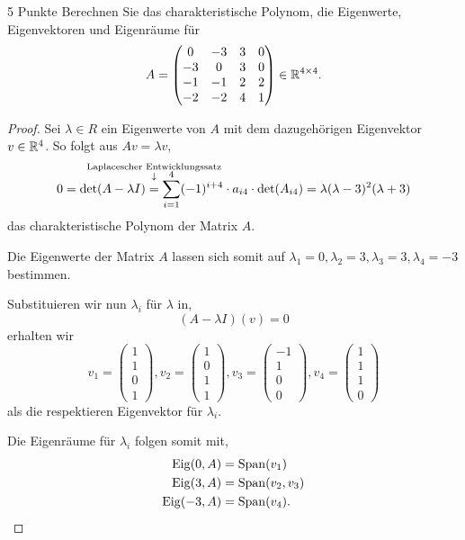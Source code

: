 \documentclass{problemset}
\begin{document}
\begin{problem}{5 Punkte}
Berechnen Sie das charakteristische Polynom, die Eigenwerte, Eigenvektoren und
Eigenräume für \[
    A = \begin{pmatrix}
        0 & -3 & 3 & 0 \\ -3 & 0 & 3 & 0 \\ -1 & -1 & 2 & 2 \\ -2 & -2 & 4 & 1
    \end{pmatrix} \in \mathbb{R}^{4 \times 4}.
\]
\begin{proof}
    Sei \(\lambda \in R\) ein Eigenwerte von \(A\) mit dem dazugehörigen
    Eigenvektor \(v \in \mathbb{R}^4\). So folgt aus \(Av = \lambda v\), \[
        0 = \det(A - \lambda I)
        \annotated{Laplacescher Entwicklungssatz}{=} \sum_{i=1}^{4} (-1)^{i+4} \cdot a_{i4} \cdot \det(A_{i4})
        = \lambda (\lambda - 3)^2(\lambda + 3)
    \] das charakteristische Polynom der Matrix \(A\).

    Die Eigenwerte der Matrix \(A\) lassen sich somit auf \(\lambda_1 = 0,
    \lambda_2 = 3, \lambda_3 = 3, \lambda_4 = -3\) bestimmen.

    Substituieren wir nun \(\lambda_i\) für \(\lambda\) in, \[
        (A - \lambda I)(v) = 0
    \] erhalten wir \[
        v_1 = \begin{pmatrix}
            1 \\ 1 \\ 0 \\ 1
        \end{pmatrix},
        v_2 = \begin{pmatrix}
            1 \\ 0 \\ 1 \\ 1
        \end{pmatrix},
        v_3 = \begin{pmatrix}
            -1 \\ 1 \\ 0 \\ 0
        \end{pmatrix},
        v_4 = \begin{pmatrix}
            1 \\ 1 \\ 1 \\ 0
        \end{pmatrix}
    \] als die respektieren Eigenvektor für \(\lambda_i\).

    Die Eigenräume für \(\lambda_i\) folgen somit mit, \begin{align*}
        \operatorname{Eig}(0, A)  & = \operatorname{Span}( v_1 )      \\
        \operatorname{Eig}(3, A)  & = \operatorname{Span}( v_2, v_3 ) \\
        \operatorname{Eig}(-3, A) & = \operatorname{Span}( v_4 ).
    \end{align*}
\end{proof}
\end{problem}
\end{document}
